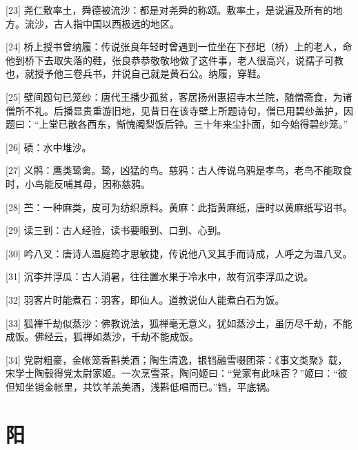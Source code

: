 \documentclass[12pt,UTF8]{ctexbook}
\begin{document}
[23] 尧仁敷率土，舜德被流沙：都是对尧舜的称颂。敷率土，是说遍及所有的地方。流沙，古人指中国以西极远的地区。

[24] 桥上授书曾纳履：传说张良年轻时曾遇到一位坐在下邳圯（桥）上的老人，命他到桥下去取失落的鞋，张良恭恭敬敬地做了这件事，老人很高兴，说孺子可教也，就授予他三卷兵书，并说自己就是黄石公。纳履，穿鞋。

[25] 壁间题句已笼纱：唐代王播少孤贫，客居扬州惠招寺木兰院，随僧斋食，为诸僧所不礼。后播显贵重游旧地，见昔日在该寺壁上所题诗句，僧已用碧纱盖护，因题曰：“上堂已散各西东，惭愧阇梨饭后钟。三十年来尘扑面，如今始得碧纱笼。”

[26] 碛：水中堆沙。

[27] 义鹘：鹰类鸷禽。鸷，凶猛的鸟。慈鸦：古人传说乌鸦是孝鸟，老鸟不能取食时，小鸟能反哺其母，因称慈鸦。

[28] 苎：一种麻类，皮可为纺织原料。黄麻：此指黄麻纸，唐时以黄麻纸写诏书。

[29] 读三到：古人经验，读书要眼到、口到、心到。

[30] 吟八叉：唐诗人温庭筠才思敏捷，传说他八叉其手而诗成，人呼之为温八叉。

[31] 沉李并浮瓜：古人消暑，往往置水果于冷水中，故有沉李浮瓜之说。

[32] 羽客片时能煮石：羽客，即仙人。道教说仙人能煮白石为饭。

[33] 狐禅千劫似蒸沙：佛教说法，狐禅毫无意义，犹如蒸沙土，虽历尽千劫，不能成饭。佛经云，狐禅如蒸沙，千劫不能成饭。

[34] 党尉粗豪，金帐笼香斟美酒；陶生清逸，银铛融雪啜团茶：《事文类聚》载，宋学士陶毂得党太尉家姬。一次烹雪茶，陶问姬曰：“党家有此味否？”姬曰：“彼但知坐销金帐里，共饮羊羔美酒，浅斟低唱而已。”铛，平底锅。





\chapter{阳}
\end{document}
